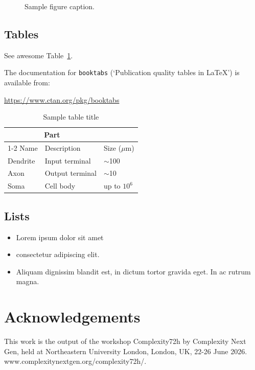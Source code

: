 \documentclass{article}
\begin{document}
\begin{figure}
	\centering
	\fbox{\rule[-.5cm]{4cm}{4cm} \rule[-.5cm]{4cm}{0cm}}
	\caption{Sample figure caption.}
	\label{fig:fig1}
\end{figure}

\subsection{Tables}
See awesome Table~\ref{tab:table}.

The documentation for \verb+booktabs+ (`Publication quality tables in LaTeX') is available from:
\begin{center}
	\url{https://www.ctan.org/pkg/booktabs}
\end{center}


\begin{table}
	\caption{Sample table title}
	\centering
	\begin{tabular}{lll}
		\toprule
		\multicolumn{2}{c}{Part}                   \\
		\cmidrule(r){1-2}
		Name     & Description     & Size ($\mu$m) \\
		\midrule
		Dendrite & Input terminal  & $\sim$100     \\
		Axon     & Output terminal & $\sim$10      \\
		Soma     & Cell body       & up to $10^6$  \\
		\bottomrule
	\end{tabular}
	\label{tab:table}
\end{table}

\subsection{Lists}
\begin{itemize}
	\item Lorem ipsum dolor sit amet
	\item consectetur adipiscing elit.
	\item Aliquam dignissim blandit est, in dictum tortor gravida eget. In ac rutrum magna.
\end{itemize}

\section{Acknowledgements}
This work is the output of the workshop Complexity72h by Complexity Next Gen, held at Northeastern University London, London, UK, 22-26 June 2026. www.complexitynextgen.org/complexity72h/.
\end{document}
